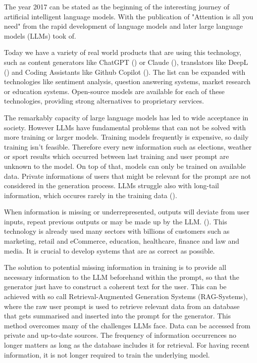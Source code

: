 The year 2017 can be stated as the beginning of the interesting journey of artificial intelligent language models. With the publication of "Attention is all you need" from \citet{vaswani2023attentionneed} the rapid development of language models and later large language models (LLMs) took of. 

Today we have a variety of real world products that are using this technology, such as content generators like ChatGPT (\citet{OpenAI_2022}) or Claude (\citet{Anthropic_2023}), translators like DeepL (\citet{DeepL_SE}) and Coding Assistants like Github Copilot (\citet{Friedman_2022}). The list can be expanded with technologies like sentiment analysis, question answering systems, market research or education systems. Open-source models are available for each of these technologies, providing strong alternatives to proprietary services.

The remarkably capacity of large language models has led to wide acceptance in society. However LLMs have fundamental problems that can not be solved with more training or larger models. Training models frequently is expensive, so daily training isn't feasible. Therefore every new information such as elections, weather or sport results which occurred between last training and user prompt are unknown to the model. On top of that, models can only be trained on available data. Private informations of users that might be relevant for the prompt are not considered in the generation process. LLMs struggle also with long-tail information, which occures rarely in the training data (\citet{Kandpal.15.11.2022}).

When information is missing or underrepresented, outputs will deviate from user inputs, repeat previous outputs or may be made up by the LLM. (\citet{Zhang.03.09.2023}). This technology is already used many sectors with billions of customers such as marketing, retail and eCommerce, education, healthcare, finance and law and media. It is crucial to develop systems that are as correct as possible.

The solution to potential missing information in training is to provide all necessary information to the LLM beforehand within the prompt, so that the generator just have to construct a coherent text for the user. This can be achieved with so call Retrieval-Augmented Generation Systems (RAG-Systems), where the raw user prompt is used to retrieve relevant data from an database that gets summarised and inserted into the prompt for the generator. This method overcomes many of the challenges LLMs face. Data can be accessed from private and up-to-date sources. The frequency of information occurrences no longer matters as long as the database includes it for retrieval. For having recent information, it is not longer required to train the underlying model.

